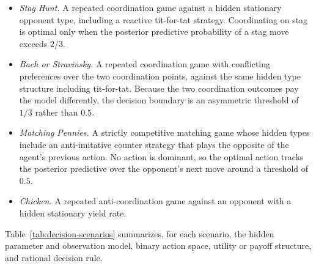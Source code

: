 \begin{itemize}
    \item \textit{Stag Hunt.}
    A repeated coordination game against a hidden stationary opponent type,
    including a reactive tit-for-tat strategy. Coordinating on stag is
    optimal only when the posterior predictive probability of a stag move
    exceeds \(2/3\).

    \item \textit{Bach or Stravinsky.}
    A repeated coordination game with conflicting preferences over the two
    coordination points, against the same hidden type structure including
    tit-for-tat. Because the two coordination outcomes pay the model
    differently, the decision boundary is an asymmetric threshold of
    \(1/3\) rather than \(0.5\).

    \item \textit{Matching Pennies.}
    A strictly competitive matching game whose hidden types include an
    anti-imitative counter strategy that plays the opposite of the agent's
    previous action. No action is dominant, so the optimal action tracks
    the posterior predictive over the opponent's next move around a
    threshold of \(0.5\).

    \item \textit{Chicken.}
    A repeated anti-coordination game against an opponent with a hidden
    stationary yield rate.
\end{itemize}

Table~\ref{tab:decision-scenarios} summarizes, for each scenario, the
hidden parameter and observation model, binary action space, utility or
payoff structure, and rational decision rule.
